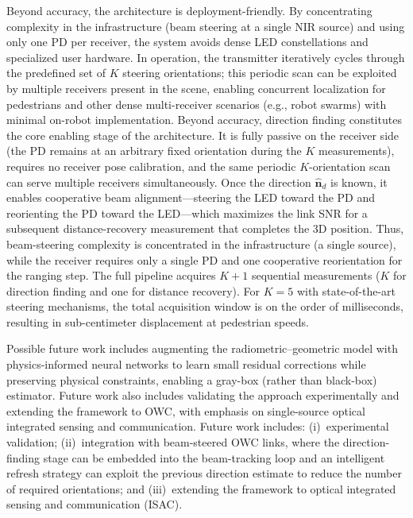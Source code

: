 \documentclass[journal]{IEEEtran}
\newcommand{\added}[1]{{\color{blue}#1}}
\newcommand{\deleted}[1]{{\color{red}#1}}
\begin{document}
\deleted{Beyond accuracy, the architecture is deployment-friendly. By concentrating complexity in the infrastructure (beam steering at a single NIR source) and using only one PD per receiver, the system avoids dense LED constellations and specialized user hardware. In operation, the transmitter iteratively cycles through the predefined set of $K$ steering orientations; this periodic scan can be exploited by multiple receivers present in the scene, enabling concurrent localization for pedestrians and other dense multi-receiver scenarios (e.g., robot swarms) with minimal on-robot implementation.}
\added{Beyond accuracy, direction finding constitutes the core enabling stage of the architecture. It is fully passive on the receiver side (the PD remains at an arbitrary fixed orientation during the $K$ measurements), requires no receiver pose calibration, and the same periodic $K$-orientation scan can serve multiple receivers simultaneously. Once the direction $\hat{\mathbf{n}}_d$ is known, it enables cooperative beam alignment---steering the LED toward the PD and reorienting the PD toward the LED---which maximizes the link SNR for a subsequent distance-recovery measurement that completes the 3D position. Thus, beam-steering complexity is concentrated in the infrastructure (a single source), while the receiver requires only a single PD and one cooperative reorientation for the ranging step.}
\added{The full pipeline acquires $K+1$ sequential measurements ($K$ for direction finding and one for distance recovery). For $K=5$ with state-of-the-art steering mechanisms, the total acquisition window is on the order of milliseconds, resulting in sub-centimeter displacement at pedestrian speeds.}

\deleted{Possible future work includes augmenting the radiometric–geometric model with physics-informed neural networks to learn small residual corrections while preserving physical constraints, enabling a gray-box (rather than black-box) estimator. Future work also includes validating the approach experimentally and extending the framework to OWC, with emphasis on single-source optical integrated sensing and communication.}
\added{Future work includes: (i)~experimental validation; (ii)~integration with beam-steered OWC links, where the direction-finding stage can be embedded into the beam-tracking loop and an intelligent refresh strategy can exploit the previous direction estimate to reduce the number of required orientations; and (iii)~extending the framework to optical integrated sensing and communication (ISAC).}
\end{document}
